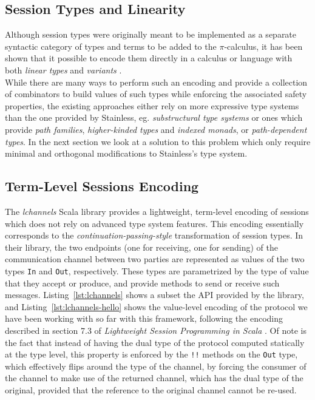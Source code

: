 \documentclass[a4paper,twoside]{article}
\newcommand{\RefCode}[1]{Listing~\ref{#1}}
\newcommand{\stt}[1]{\texttt{\small{#1}}}
\begin{document}
\subsection{Session Types and Linearity}

Although session types were originally meant to be implemented as a separate syntactic category of types and terms to be added to the $\pi$-calculus, it has been shown that it possible to encode them directly in a calculus or language with both \textit{linear types} and \textit{variants} \cite{Wadler:2012:PS:2364527.2364568, Dardha:2012:STR:2370776.2370794}.\\

While there are many ways to perform such an encoding and provide a collection of combinators to build values of such types while enforcing the associated safety properties, the existing approaches \cite{st_lin_haskell, Jespersen:2015:STR:2808098.2808100} either rely on more expressive type systems than the one provided by Stainless, eg. \textit{substructural type systems} or ones which provide \textit{path families}, \textit{higher-kinded types} and \textit{indexed monads}, or \textit{path-dependent types}. In the next section we look at a solution to this problem which only require minimal and orthogonal modifications to Stainless's type system.

\subsection{Term-Level Sessions Encoding}

The \textit{lchannels} Scala library \cite{lchannels} provides a lightweight, term-level encoding of sessions which does not rely on advanced type system features. This encoding essentially corresponds to the \textit{continuation-passing-style} transformation of session types. In their library, the two endpoints (one for receiving, one for sending) of the communication channel between two parties are represented as values of the two types \stt{In} and \stt{Out}, respectively. These types are parametrized by the type of value that they accept or produce, and provide methods to send or receive such messages. \RefCode{lst:lchannels} shows a subset the API provided by the library, and \RefCode{lst:lchannels-hello} shows the value-level encoding of the protocol we have been working with so far with this framework, following the encoding described in section 7.3 of \textit{Lightweight Session Programming in Scala} \cite{lchannels}. Of note is the fact that instead of having the dual type of the protocol computed statically at the type level, this property is enforced by the \stt{!!} methods on the \stt{Out} type, which effectively flips around the type of the channel, by forcing the consumer of the channel to make use of the returned channel, which has the dual type of the original, provided that the reference to the original channel cannot be re-used.
\end{document}
